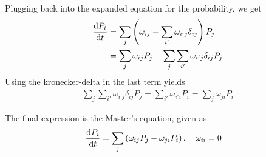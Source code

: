 \documentclass[a4paper, english, 12pt]{article}
\newcommand{\closed}[1]{\left( #1 \right)}
\begin{document}
\begin{multicols*}{2}
Plugging back into the expanded equation for the probability, we get 
\begin{align*}
    \dv{P_i}{t} &= \sum_j \closed{\omega_{ij} - \sum_{i'}\omega_{i' j}\delta_{ij}}P_j \\ 
    &= \sum_j \omega_{ij}P_j - \sum_j \sum_{i'} \omega_{i' j} \delta_{ij} P_j
\end{align*}
Using the kronecker-delta in the last term yields 
\begin{align*}
    \sum_j \sum_{i'} \omega_{i' j} \delta_{ij} P_j = \sum_{i'} \omega_{i' i} P_i = \sum_j \omega_{ji} P_i 
\end{align*}

The final expression is the Master's equation, given as 
\begin{align*}
    \dv{P_i}{t} &= \sum_{j} \closed{\omega_{ij}P_j - \omega_{ji}P_i},\quad \omega_{ii}=0
\end{align*}

\end{multicols*}
\end{document}

